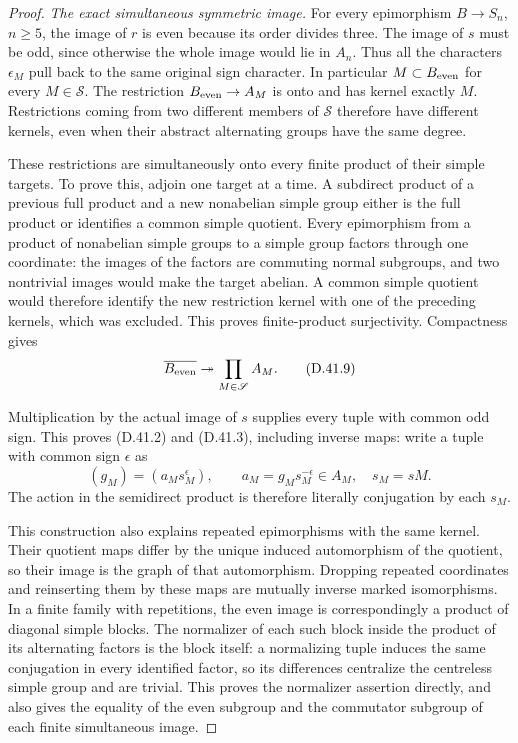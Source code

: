 \begin{proof}
\emph{The exact simultaneous symmetric image.}
For every epimorphism $B\to S_n$, $n\ge5$, the image
of $r$ is even because its order divides three.
The image of $s$ must be odd, since otherwise the
whole image would lie in $A_n$. Thus all the
characters $\epsilon_M$ pull back to the same
original sign character. In particular
$M\subset B_{\rm even}$ for every $M\in\mathscr S$.
The restriction $B_{\rm even}\to A_M$ is onto
and has kernel exactly $M$. Restrictions coming
from two different members of $\mathscr S$
therefore have different kernels, even when
their abstract alternating groups have the
same degree.

These restrictions are simultaneously onto every
finite product of their simple targets. To prove
this, adjoin one target at a time. A subdirect
product of a previous full product and a new
nonabelian simple group either is the full
product or identifies a common simple quotient.
Every epimorphism from a product of nonabelian
simple groups to a simple group factors through
one coordinate: the images of the factors are
commuting normal subgroups, and two nontrivial
images would make the target abelian.
A common simple quotient would therefore
identify the new restriction kernel with one
of the preceding kernels, which was excluded.
This proves finite-product surjectivity.
Compactness gives
\[
 \overline{B_{\rm even}}\twoheadrightarrow
                  \prod_{M\in\mathscr S}A_M.            \tag{D.41.9}
\]

Multiplication by the actual image of $s$ supplies
every tuple with common odd sign. This proves
(D.41.2) and (D.41.3), including inverse maps:
write a tuple with common sign $\epsilon$ as
\[
 (g_M)=(a_Ms_M^\epsilon),\qquad
 a_M=g_Ms_M^{-\epsilon}\in A_M,
 \quad s_M=sM.                                         \tag{D.41.10}
\]
The action in the semidirect product is therefore
literally conjugation by each $s_M$.

This construction also explains repeated
epimorphisms with the same kernel. Their quotient
maps differ by the unique induced automorphism
of the quotient, so their image is the graph of
that automorphism. Dropping repeated coordinates
and reinserting them by these maps are mutually
inverse marked isomorphisms. In a finite family
with repetitions, the even image is correspondingly
a product of diagonal simple blocks. The normalizer
of each such block inside the product of its
alternating factors is the block itself: a
normalizing tuple induces the same conjugation
in every identified factor, so its differences
centralize the centreless simple group and are
trivial. This proves the normalizer assertion
directly, and also gives the equality of the
even subgroup and the commutator subgroup of
each finite simultaneous image.


\end{proof}
